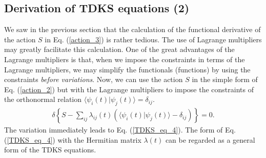\documentclass[twoside]{article}
\newcommand{\inproduct}[2]{\langle #1 | #2 \rangle}
\begin{document}
{\subsection{Derivation of TDKS equations (2)}

We saw in the previous section that the calculation of the functional
derivative of the action $S$ in Eq. (\ref{action_3}) is rather
tedious.
The use of Lagrange multipliers may greatly facilitate this calculation.
One of the great advantages of the Lagrange multipliers is that,
when we impose the constraints in terms of the Lagrange multipliers,
we may simplify the functionals (functions) by using the constraints
{\it before variations}.
Now, we can use the action $S$ in the simple form of Eq. (\ref{action_2}) but
with the Lagrange multipliers to impose the constraints of the
orthonormal relation $\inproduct{\psi_i(t)}{\psi_j(t)} = \delta_{ij}$.
\begin{eqnarray}
\delta \left\{
S - \sum_{ij} \lambda_{ij}(t)
 \left( \inproduct{\psi_i(t)}{\psi_j(t)} - \delta_{ij} \right)
\right\}
= 0 .
\end{eqnarray}
The variation immediately leads to Eq. (\ref{TDKS_eq_4}).
The form of Eq. (\ref{TDKS_eq_4}) with the Hermitian matrix $\lambda(t)$
can be regarded as a general form of the TDKS equations.

}
\end{document}
